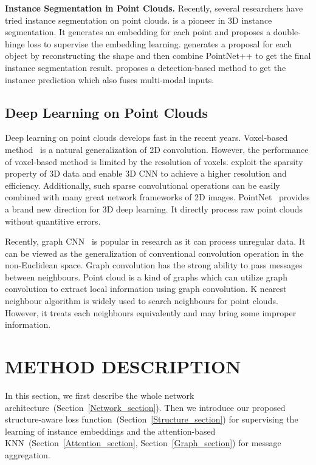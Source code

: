 \documentclass{article}
\begin{document}
\textbf{Instance Segmentation in Point Clouds. }Recently, several researchers have tried instance segmentation on point clouds. \cite{wang2018sgpn} is a pioneer in 3D instance segmentation. It generates an embedding for each point and proposes a double-hinge loss to supervise the embedding learning. \cite{yi2018gspn} generates a proposal for each object by reconstructing the shape and then combine PointNet++ to get the final instance segmentation result. \cite{hou20183d} proposes a detection-based method to get the instance prediction which also fuses multi-modal inputs.

\subsection{Deep Learning on Point Clouds}
Deep learning on point clouds develops fast in the recent years. Voxel-based method~\cite{tchapmi2017segcloud} is a natural generalization of 2D convolution. However, the performance of voxel-based method is limited by the resolution of voxels. \cite{riegler2017octnet,wang2017cnn,graham20183d} exploit the sparsity property of 3D data and enable 3D CNN to achieve a higher resolution and efficiency. Additionally, such sparse convolutional operations can be easily combined with many great network frameworks of 2D images. PointNet~\cite{qi2017pointnet} provides a brand new direction for 3D deep learning. It directly process raw point clouds without quantitive errors. 

Recently, graph CNN~\cite{bruna2013spectral,kipf2016semi,simonovsky2017dynamic,wang2018dynamic} is popular in research as it can process unregular data. It can be viewed as the generalization of conventional convolution operation in the non-Euclidean space. Graph convolution has the strong ability to pass messages between neighbours. Point cloud is a kind of graphs which can utilize graph convolution to extract local information using graph convolution. K nearest neighbour algorithm is widely used to search neighbours for point clouds. However, it treats each neighbours equivalently and may bring some improper information.

\section{METHOD DESCRIPTION}
In this section, we first describe the whole network architecture~(Section~\ref{Network_section}). Then we introduce our proposed structure-aware loss function~(Section~\ref{Structure_section}) for supervising the learning of instance embeddings and the attention-based KNN~(Section~\ref{Attention_section}, Section~\ref{Graph_section}) for message aggregation. 
\end{document}
